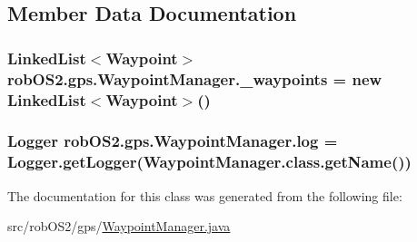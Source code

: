 \subsection{Member Data Documentation}
\hypertarget{classrob_o_s2_1_1gps_1_1_waypoint_manager_ad1cbf84ee21f806c672f906fe2abeeb1}{
\subsubsection[{\_\-waypoints}]{\setlength{\rightskip}{0pt plus 5cm}LinkedList$<${\bf Waypoint}$>$ {\bf robOS2.gps.WaypointManager.\_\-waypoints} = new LinkedList$<${\bf Waypoint}$>$()}}
\label{classrob_o_s2_1_1gps_1_1_waypoint_manager_ad1cbf84ee21f806c672f906fe2abeeb1}
\hypertarget{classrob_o_s2_1_1gps_1_1_waypoint_manager_a09d4cc1af107fb1aafb45042b3707cfe}{
\subsubsection[{log}]{\setlength{\rightskip}{0pt plus 5cm}Logger {\bf robOS2.gps.WaypointManager.log} = Logger.getLogger(WaypointManager.class.getName())}}
\label{classrob_o_s2_1_1gps_1_1_waypoint_manager_a09d4cc1af107fb1aafb45042b3707cfe}


The documentation for this class was generated from the following file:\begin{DoxyCompactItemize}
\item 
src/robOS2/gps/\hyperlink{_waypoint_manager_8java}{WaypointManager.java}\end{DoxyCompactItemize}
